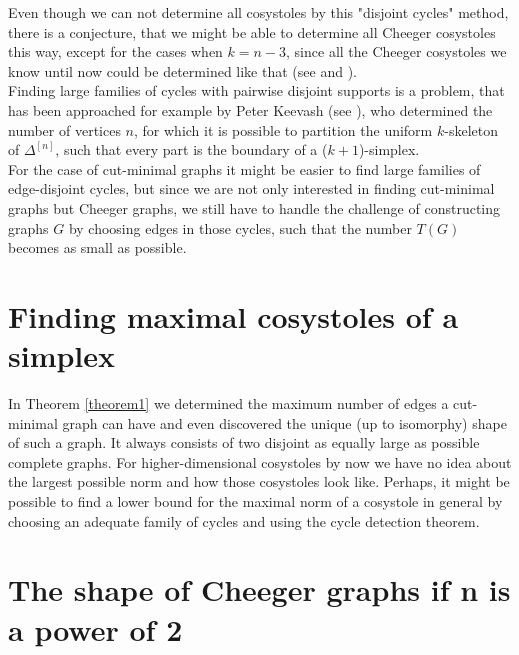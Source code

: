

Even though we can not determine all cosystoles by this "disjoint cycles" method, there is a conjecture, that we might be able to determine all Cheeger cosystoles this way, except for the cases when \(k=n-3\), since all the Cheeger cosystoles we know until now could be determined like that (see \cite{1} and \cite{6}).\\
Finding large families of cycles with pairwise disjoint supports is a problem, that has been approached for example by Peter Keevash (see \cite{11}), who determined the number of vertices \(n\), for which it is possible to partition the uniform \(k\)-skeleton of \(\Delta^{[n]}\), such that every part is the boundary of a (\(k+1\))-simplex.\\
For the case of cut-minimal graphs it might be easier to find large families of edge-disjoint cycles, but since we are not only interested in finding cut-minimal graphs but Cheeger graphs, we still have to handle the challenge of constructing graphs \(G\) by choosing edges in those cycles, such that the number \(T(G)\) becomes as small as possible.

\section{Finding maximal cosystoles of a simplex}

In Theorem \ref{theorem1} we determined the maximum number of edges a cut-minimal graph can have and even discovered the unique (up to isomorphy) shape of such a graph. It always consists of two disjoint as equally large as possible complete graphs. For higher-dimensional cosystoles by now we have no idea about the largest possible norm and how those cosystoles look like. Perhaps, it might be possible to find a lower bound for the maximal norm of a cosystole in general by choosing an adequate family of cycles and using the cycle detection theorem.

\section{The shape of Cheeger graphs if n is a power of 2}

